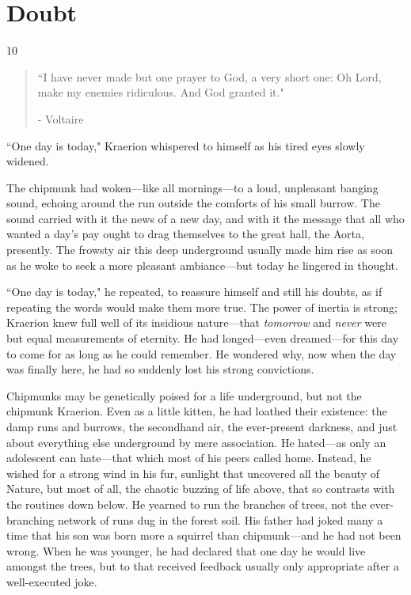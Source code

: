 \chapter{Doubt}

\vspace{-1.3cm}
\begin{localsize}{10}
	\begin{quote}
		``I have never made but one prayer to God, a very short one: Oh Lord, make my enemies ridiculous. And God granted it."
		\begin{flushright}- Voltaire \end{flushright}
	\end{quote}
\end{localsize}
\vspace{1cm}


``One day is today," Kraerion whispered to himself as his tired eyes slowly widened.

The chipmunk had woken---like all mornings---to a loud, unpleasant banging sound, echoing around the run outside the comforts of his small burrow.
The sound carried with it the news of a new day, and with it the message that all who wanted a day's pay ought to drag themselves to the great hall, the Aorta, presently.
The frowsty air this deep underground usually made him rise as soon as he woke to seek a more pleasant ambiance---but today he lingered in thought.

``One day is today," he repeated, to reassure himself and still his doubts, as if repeating the words would make them more true.
The power of inertia is strong; Kraerion knew full well of its insidious nature---that \textit{tomorrow} and \textit{never} were but equal measurements of eternity.
He had longed---even dreamed---for this day to come for as long as he could remember.
He wondered why, now when the day was finally here, he had so suddenly lost his strong convictions.

Chipmunks may be genetically poised for a life underground, but not the chipmunk Kraerion.
Even as a little kitten, he had loathed their existence: the damp runs and burrows, the secondhand air, the ever-present darkness, and just about everything else underground by mere association.
He hated---as only an adolescent can hate---that which most of his peers called home.
Instead, he wished for a strong wind in his fur, sunlight that uncovered all the beauty of Nature, but most of all, the chaotic buzzing of life above, that so contrasts with the routines down below.
He yearned to run the branches of trees, not the ever-branching network of runs dug in the forest soil.
His father had joked many a time that his son was born more a squirrel than chipmunk---and he had not been wrong.
When he was younger, he had declared that one day he would live amongst the trees, but to that received feedback usually only appropriate after a well-executed joke.


